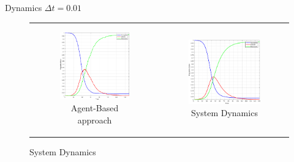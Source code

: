 \documentclass{beamer}
\begin{document}
\begin{frame}{Dynamics $\Delta t = 0.01$}
\begin{figure}
\begin{center}
	\begin{tabular}{c c}
		\begin{subfigure}[b]{0.4\textwidth}
			\centering
			\includegraphics[width=0.95\textwidth, angle=0]{./fig/SIR_Yampa_dt001.png}
			\caption*{Agent-Based approach}
		\end{subfigure}
    	
    	&
  
		\begin{subfigure}[b]{0.4\textwidth}
			\centering
			\includegraphics[width=1\textwidth, angle=0]{./fig/SIR_SD_001dt.png}
			\caption*{System Dynamics}
		\end{subfigure}
	\end{tabular}
\end{center}
\end{figure}
\end{frame}
\end{document}
